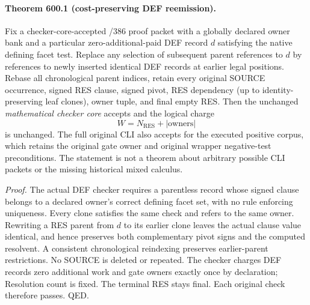 \documentclass[11pt]{article}
\begin{document}
\paragraph{Theorem 600.1 (cost-preserving DEF reemission).}
Fix a checker-core-accepted /386 proof packet with a globally declared owner bank and a particular zero-additional-paid DEF record $d$ satisfying the native defining facet test. Replace any selection of subsequent parent references to $d$ by references to newly inserted identical DEF records at earlier legal positions. Rebase all chronological parent indices, retain every original SOURCE occurrence, signed RES clause, signed pivot, RES dependency (up to identity-preserving leaf clones), owner tuple, and final empty RES. Then the unchanged \emph{mathematical checker core} accepts and the logical charge
\[
W=N_{\mathrm{RES}}+\lvert\mathrm{owners}\rvert
\]
is unchanged. The full original CLI also accepts for the executed positive corpus, which retains the original gate owner and original wrapper negative-test preconditions. The statement is not a theorem about arbitrary possible CLI packets or the missing historical mixed calculus.

\noindent\emph{Proof.}
The actual DEF checker requires a parentless record whose signed clause belongs to a declared owner's correct defining facet set, with no rule enforcing uniqueness. Every clone satisfies the same check and refers to the same owner. Rewriting a RES parent from $d$ to its earlier clone leaves the actual clause value identical, and hence preserves both complementary pivot signs and the computed resolvent. A consistent chronological reindexing preserves earlier-parent restrictions. No SOURCE is deleted or repeated. The checker charges DEF records zero additional work and gate owners exactly once by declaration; Resolution count is fixed. The terminal RES stays final. Each original check therefore passes. QED.
\end{document}

